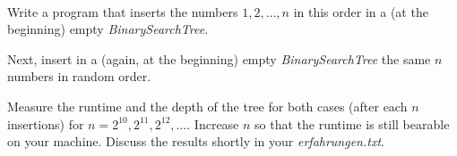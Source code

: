  \\
Write a program that inserts the numbers $1, 2, 
\ldots, n$ in this order in a (at the beginning) empty 
\emph{BinarySearchTree}.

Next, insert in a (again, at the beginning) empty \emph{BinarySearchTree}
the same $n$ numbers in random order.

Measure the runtime and the depth of the tree for both cases (after each $n$ 
insertions) for $n = 2^{10}, 2^{11}, 2^{12},
\ldots$. Increase $n$ so that the runtime is still bearable on your machine. 
Discuss the results shortly in your \emph{erfahrungen.txt}.
